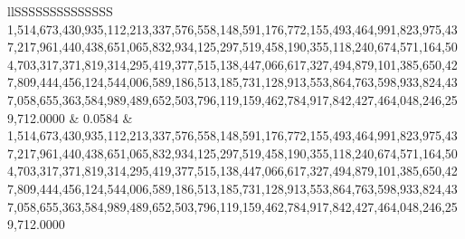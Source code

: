 \begin{table}
\begin{tabular}{llSSSSSSSSSSSSSS}
1,514,673,430,935,112,213,337,576,558,148,591,176,772,155,493,464,991,823,975,437,217,961,440,438,651,065,832,934,125,297,519,458,190,355,118,240,674,571,164,504,703,317,371,819,314,295,419,377,515,138,447,066,617,327,494,879,101,385,650,427,809,444,456,124,544,006,589,186,513,185,731,128,913,553,864,763,598,933,824,437,058,655,363,584,989,489,652,503,796,119,159,462,784,917,842,427,464,048,246,259,712.0000 & 0.0584 & 1,514,673,430,935,112,213,337,576,558,148,591,176,772,155,493,464,991,823,975,437,217,961,440,438,651,065,832,934,125,297,519,458,190,355,118,240,674,571,164,504,703,317,371,819,314,295,419,377,515,138,447,066,617,327,494,879,101,385,650,427,809,444,456,124,544,006,589,186,513,185,731,128,913,553,864,763,598,933,824,437,058,655,363,584,989,489,652,503,796,119,159,462,784,917,842,427,464,048,246,259,712.0000 \\

\end{tabular}
\end{table}
